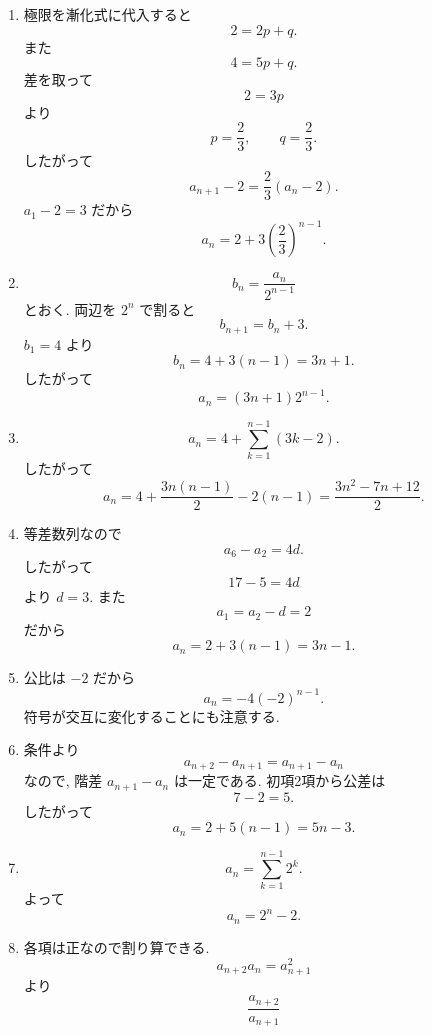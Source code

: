 \begin{enumerate}[label=\textbf{問\arabic*.},leftmargin=3.8em,format=\bookitemlink{practice-basic}{solution}{problem}]
\[            a_n
            =1+\sum_{k=1}^{n-1}
            \left(\frac1k-\frac1{k+1}\right)
            =1+1-\frac1n
            =2-\frac1n.
          \]
        \item 極限を漸化式に代入すると
          \[
            2=2p+q.
          \]
              また
          \[
            4=5p+q.
          \]
              差を取って
          \[
            2=3p
          \]
              より
          \[
            p=\frac23,\qquad q=\frac23.
          \]
              したがって
          \[
            a_{n+1}-2=\frac23(a_n-2).
          \]
              \(a_1-2=3\) だから
          \[
            a_n=2+3\left(\frac23\right)^{n-1}.
          \]
        \item \[
            b_n=\frac{a_n}{2^{n-1}}
          \]
              とおく.
              両辺を \(2^n\) で割ると
          \[
            b_{n+1}=b_n+3.
          \]
              \(b_1=4\) より
          \[
            b_n=4+3(n-1)=3n+1.
          \]
              したがって
          \[
            a_n=(3n+1)2^{n-1}.
          \]
        \item \[
            a_n
            =4+\sum_{k=1}^{n-1}(3k-2).
          \]
              したがって
          \[
            a_n
            =4+\frac{3n(n-1)}2-2(n-1)
            =\frac{3n^2-7n+12}{2}.
          \]
        \item 等差数列なので
          \[
            a_6-a_2=4d.
          \]
              したがって
          \[
            17-5=4d
          \]
              より \(d=3\). また
          \[
            a_1=a_2-d=2
          \]
              だから
          \[
            a_n=2+3(n-1)=3n-1.
          \]
        \item 公比は \(-2\) だから
          \[
            a_n=-4(-2)^{n-1}.
          \]
              符号が交互に変化することにも注意する.
        \item 条件より
          \[
            a_{n+2}-a_{n+1}=a_{n+1}-a_n
          \]
              なので, 階差 \(a_{n+1}-a_n\) は一定である.
              初項2項から公差は
          \[
            7-2=5.
          \]
              したがって
          \[
            a_n=2+5(n-1)=5n-3.
          \]
        \item \[
            a_n
            =\sum_{k=1}^{n-1}2^k.
          \]
              よって
          \[
            a_n=2^n-2.
          \]
        \item 各項は正なので割り算できる.
          \[
            a_{n+2}a_n=a_{n+1}^2
          \]
              より
          \[
            \frac{a_{n+2}}{a_{n+1}}
\]
\end{enumerate}
